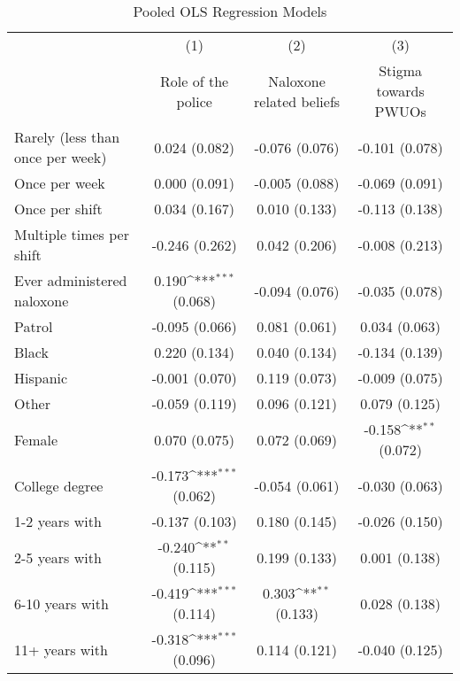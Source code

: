 \begin{table}[htbp]\centering
\def\sym#1{\ifmmode^{#1}\else\(^{#1}\)\fi}
\caption{\centering Pooled OLS Regression Models}
\begin{tabular}{l*{3}{c}}
\toprule
                &\multicolumn{1}{c}{(1)}&\multicolumn{1}{c}{(2)}&\multicolumn{1}{c}{(3)}\\
                &\multicolumn{1}{c}{Role of the police}&\multicolumn{1}{c}{Naloxone related beliefs}&\multicolumn{1}{c}{Stigma towards PWUOs}\\
\midrule
Rarely (less than once per week)&0.024 (0.082)         &-0.076 (0.076)         &-0.101 (0.078)         \\
Once per week   &0.000 (0.091)         &-0.005 (0.088)         &-0.069 (0.091)         \\
Once per shift  &0.034 (0.167)         &0.010 (0.133)         &-0.113 (0.138)         \\
Multiple times per shift&-0.246 (0.262)         &0.042 (0.206)         &-0.008 (0.213)         \\
Ever administered naloxone&0.190\sym{***} (0.068)         &-0.094 (0.076)         &-0.035 (0.078)         \\
Patrol          &-0.095 (0.066)         &0.081 (0.061)         &0.034 (0.063)         \\
Black           &0.220 (0.134)         &0.040 (0.134)         &-0.134 (0.139)         \\
Hispanic        &-0.001 (0.070)         &0.119 (0.073)         &-0.009 (0.075)         \\
Other           &-0.059 (0.119)         &0.096 (0.121)         &0.079 (0.125)         \\
Female          &0.070 (0.075)         &0.072 (0.069)         &-0.158\sym{**} (0.072)         \\
College degree  &-0.173\sym{***} (0.062)         &-0.054 (0.061)         &-0.030 (0.063)         \\
1-2 years with  &-0.137 (0.103)         &0.180 (0.145)         &-0.026 (0.150)         \\
2-5 years with  &-0.240\sym{**} (0.115)         &0.199 (0.133)         &0.001 (0.138)         \\
6-10 years with &-0.419\sym{***} (0.114)         &0.303\sym{**} (0.133)         &0.028 (0.138)         \\
11+ years with  &-0.318\sym{***} (0.096)         &0.114 (0.121)         &-0.040 (0.125)         \\

\end{tabular}
\end{table}
